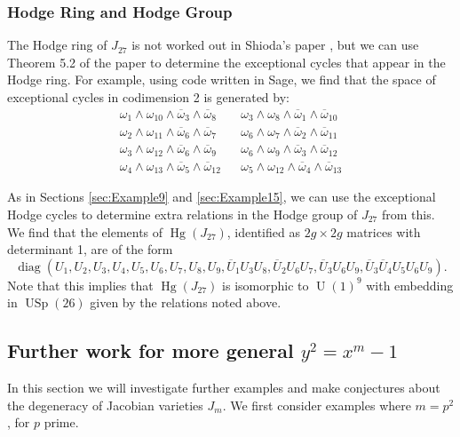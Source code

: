 \documentclass[reqno, oneside, 12pt]{amsart}
\DeclareMathOperator{\USp}{USp}
\DeclareMathOperator{\U}{U}
\DeclareMathOperator{\diag}{diag}
\DeclareMathOperator{\Hg}{Hg}
\theoremstyle{remark}
\numberwithin{equation}{section}
\begin{document}
\subsubsection{Hodge Ring and Hodge Group}

The Hodge ring of $J_{27}$ is not worked out in Shioda's paper \cite{Shioda82}, but we can use Theorem 5.2 of the paper to determine the exceptional cycles that appear in the Hodge ring. For example, using code written in Sage, we find that the space of exceptional cycles in codimension 2 is generated by:
\begin{align*}
    \omega_1\wedge\omega_{10}\wedge\overline\omega_3\wedge\overline\omega_8 &&\omega_3\wedge\omega_8\wedge\overline\omega_1\wedge\overline\omega_{10}  \\
    \omega_2\wedge\omega_{11}\wedge\overline\omega_6\wedge\overline\omega_7 &&\omega_6\wedge\omega_7\wedge\overline\omega_2\wedge\overline\omega_{11}\\
    \omega_3\wedge\omega_{12}\wedge\overline\omega_6\wedge\overline\omega_{9}
    &&\omega_6\wedge\omega_{9}\wedge\overline\omega_3\wedge\overline\omega_{12}\\
    \omega_4\wedge\omega_{13}\wedge\overline\omega_5\wedge\overline\omega_{12}  &&\omega_5\wedge\omega_{12}\wedge\overline\omega_4\wedge\overline\omega_{13}
\end{align*}

As in Sections \ref{sec:Example9} and \ref{sec:Example15}, we can use the exceptional Hodge cycles to determine extra relations in the Hodge group of $J_{27}$ from this. We find that  the elements of $\Hg(J_{27})$, identified as $2g\times 2g$ matrices with determinant 1, are of the form
$$\diag(U_1,U_2,U_3,U_4,U_5,U_6,U_7,U_8,U_9,\overline U_1U_3U_8,\overline U_2U_6U_7,\overline U_3U_6U_9,\overline U_3\overline U_4U_5U_6U_9).$$
Note that this implies that $\Hg(J_{27})$ is isomorphic to $\U(1)^9$ with embedding in $\USp(26)$ given by the relations noted above.







\subsection{Further work for more general $y^2=x^m-1$}

In this section we will investigate further examples and make conjectures about the degeneracy of  Jacobian varieties $J_m$. We first consider examples where $m=p^2$, for $p$ prime.
\end{document}
